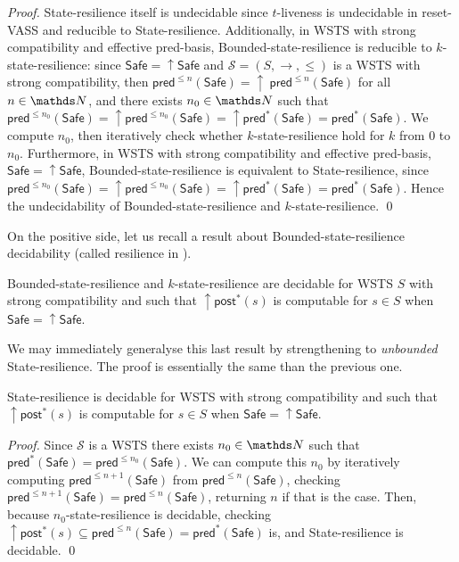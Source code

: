 \documentclass[runningheads]{llncs}
\newcommand{\pred}{\textsf{pred}}
\newcommand{\post}{\textsf{post}}
\newcommand{\Safe}{\textsf{Safe}}
\begin{document}
\begin{proof}
{\sc State-resilience} itself is undecidable 
since 
{\sc $t$-liveness} is undecidable in reset-VASS
and reducible to {\sc State-resilience}.
Additionally, in WSTS with strong compatibility and effective pred-basis, {\sc Bounded-state-resilience} is
reducible to {\sc $k$-state-resilience}:
since $\Safe=\uparrow \Safe$ and
$\mathscr{S}=(S,\rightarrow,\leq)$ is a WSTS with strong 
compatibility, then $\pred^{\leq n}(\Safe)= \uparrow~\pred^{\leq n}(\Safe)$ for all $n \in \N$,
and there exists $n_0 \in \N$ such that 
$\pred^{\leq n_0}(\Safe) = \uparrow \pred^{\leq n_0}(\Safe) = \uparrow \pred^*(\Safe) = \pred^*(\Safe)$.
We compute 
$n_0$, then iteratively check whether $k$-state-resilience 
hold for $k$ from $0$ to $n_0$.  
Furthermore, in WSTS with strong compatibility and effective pred-basis,  $\Safe=\uparrow \Safe$, {\sc Bounded-state-resilience} is equivalent to {\sc State-resilience},
since 
$\pred^{\leq n_0}(\Safe) = \uparrow \pred^{\leq n_0}(\Safe) = {\uparrow \pred^*(\Safe)} = \pred^*(\Safe)$.
Hence the undecidability of {\sc Bounded-state-resilience}
and 
 {\sc $k$-state-resilience}. \qed
\end{proof}






On the positive side, let us recall a result about {\sc Bounded-state-resilience} decidability (called resilience in \cite{DBLP:conf/gg/Ozkan22,DBLP:journals/corr/abs-2108-00889}).
\begin{theorem}\cite{DBLP:conf/gg/Ozkan22,DBLP:journals/corr/abs-2108-00889}\label{ref ozkan}
{\sc Bounded-state-resilience} and {\sc $k$-state-resilience} are decidable for WSTS $S$ with strong compatibility and such that $\uparrow \post^*(s)$ is computable for $s \in S$
when
$\Safe=\uparrow \Safe$.
\end{theorem}

We may immediately generalyse this last result by strengthening to \emph{unbounded} {\sc State-resilience}. The proof is essentially the same than the previous one.

\begin{corollary}\label{postcomputable}
{\sc State-resilience} is decidable for WSTS with strong compatibility and such that $\uparrow \post^*(s)$ is computable for $s \in S$
when
$\Safe=\uparrow \Safe$.
\end{corollary}

\begin{proof}
Since $\mathscr{S}$ is a WSTS there exists $n_0 \in \N$ such that
$\pred^*(\Safe) =  \pred^{\leq n_0}(\Safe)$. We can compute this $n_0$ by iteratively computing 
$\pred^{\leq n+1}(\Safe)$ from $\pred^{\leq n}(\Safe)$, checking 
$\pred^{\leq n+1}(\Safe) = \pred^{\leq n}(\Safe)$, 
returning $n$ if that is the case.
Then, because {\sc $n_0$-state-resilience} is decidable, 
checking $\uparrow \post^*(s) 
 \subseteq \pred^{\leq n}(\Safe) = \pred^*(\Safe)$ is,
and {\sc State-resilience} is decidable. \qed
\end{proof}
\end{document}
